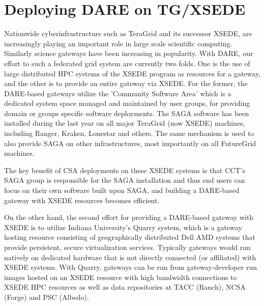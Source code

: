 \documentclass[]{svjour3}
\begin{document}
%

\section{Deploying DARE on TG/XSEDE}
Nationwide cyberinfrastructure such as TeraGrid and its successor XSEDE, are increasingly playing an important role in 
large scale scientific computing. Similarly science gateways have been increasing in popularity.
With DARE, our effort to such a federated grid system are currently two folds. 
One is the use of large distributed HPC systems of the 
XSEDE program as resources for a gateway, and the other is to provide an entire gateway via XSEDE. 
For the former, the DARE-based gateways utilize the 'Community Software Area' which is a dedicated system space
managed and maintained by user groups, for providing domain or groups
specific software deployments. The SAGA software has been installed during the last year on all major TeraGrid (now 
XSEDE) machines, including Ranger, Kraken, Lonestar and others. The same mechanism is used to also provide SAGA on other 
infrastructures, most importantly on all FutureGrid machines.

The key benefit of CSA deployments on these XSEDE systems is that CCT's SAGA group is responsible for the SAGA 
installation and thus end users can focus on their own software built upon SAGA, and building a DARE-based gateway with 
XSEDE resources becomes efficient.

On the other hand, the second effort for providing a DARE-based gateway with XSEDE is to utilize Indiana University's 
Quarry system, which is a gateway hosting resource consisting of geographically
distributed Dell AMD systems that provide persistent, secure virtualization services.
Typically gateways would run natively on dedicated hardware that is
not directly connected (or affiliated) with XSEDE systems. With Quarry,
gateways can be run from gateway-developer run images hosted on an
XSEDE resource with high bandwidth connections to XSEDE HPC resources
as well as data repositories at TACC (Ranch), NCSA (Forge) and PSC (Albedo).
\end{document}
